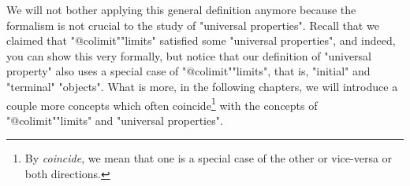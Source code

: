 \documentclass[main.tex]{subfiles}
\begin{document}
We will not bother applying this general definition anymore because the formalism is not crucial to the study of "universal properties". Recall that we claimed that "@colimit""limits" satisfied some "universal properties", and indeed, you can show this very formally, but notice that our definition of "universal property" also uses a special case of "@colimit""limits", that is, "initial" and "terminal" "objects". What is more, in the following chapters, we will introduce a couple  more concepts which often coincide\footnote{By \textit{coincide}, we mean that one is a special case of the other or vice-versa or both directions.} with the concepts of "@colimit""limits" and "universal properties".
\end{document}
